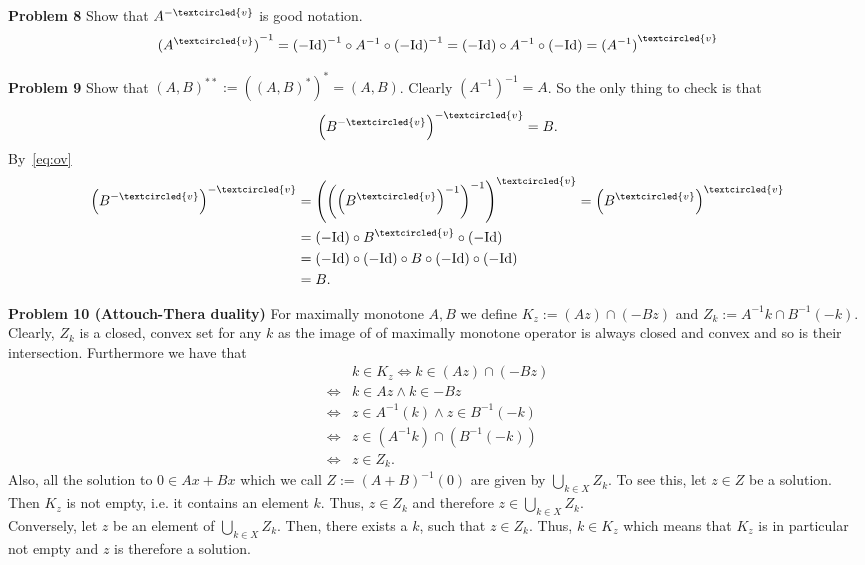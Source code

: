 \documentclass{scrartcl}
\theoremstyle{plain}
\theoremstyle{remark}
\newcommand{\Id}{\textup{Id}}
\newcommand{\ov}{\textcircled{v}}
\begin{document}
\textbf{Problem 8} Show that $A^{-\ov}$ is good notation.
\begin{equation}
  \label{eq:ov}
  {(A^{\ov})}^{-1} = {(-\Id)}^{-1} \circ A^{-1} \circ {(-\Id)}^{-1} = (-\Id) \circ A^{-1} \circ (-\Id) = {(A^{-1})}^{\ov}
\end{equation}

\textbf{Problem 9} Show that ${(A, B)}^{**} := {({(A, B)}^*)}^* = {(A, B)}$.
Clearly ${(A^{-1})}^{-1} = A$. So the only thing to check is that
\begin{equation}
  {\left(B^{-\ov}\right)}^{-\ov} = B.
\end{equation}
By~\eqref{eq:ov}
\begin{equation}
  \begin{aligned}
    {\left(B^{-\ov}\right)}^{-\ov} &= {\left({\left({\left(B^{\ov}\right)}^{-1}\right)}^{-1}\right)}^{\ov} = {\left(B^{\ov}\right)}^{\ov}\\
    &= {(-\Id)} \circ B^{\ov} \circ {(-\Id)} \\
    &= {(-\Id)} \circ {(-\Id)} \circ B \circ {(-\Id)} \circ {(-\Id)} \\
    &= B.
  \end{aligned}
\end{equation}

\textbf{Problem 10 (Attouch-Thera duality)} For maximally monotone $A,B$ we define $K_{z} := (Az) \cap (-Bz)$ and $Z_{k} := A^{-1}k \cap B^{-1}(-k)$. Clearly, $Z_{k}$ is a closed, convex set for any $k$ as the image of of maximally monotone operator is always closed and convex and so is their intersection.
Furthermore we have that
\begin{equation}
  \begin{aligned}
    & k \in K_{z} \Leftrightarrow k \in (Az) \cap (-Bz) \\
    \Leftrightarrow& k \in Az \wedge k \in -Bz \\
    \Leftrightarrow& z \in A^{-1}(k) \wedge z \in B^{-1}(-k) \\
    \Leftrightarrow& z \in (A^{-1}k) \cap (B^{-1}(-k)) \\
    \Leftrightarrow& z \in Z_{k}.
  \end{aligned}
\end{equation}
Also, all the solution to $0 \in Ax + Bx$ which we call $Z:= {(A + B)}^{-1}(0)$ are given by $\bigcup_{k \in X} Z_{k}$. To see this, let $z \in Z$ be a solution. Then $K_{z}$ is not empty, i.e. it contains an element $k$. 
Thus, $z \in Z_{k}$ and therefore $z \in \bigcup_{k \in X} Z_{k}$.\\
Conversely, let $z$ be an element of $\bigcup_{k \in X} Z_{k}$. Then, there exists a $k$, such that $z \in Z_{k}$. Thus, $k \in K_{z}$ which means that $K_{z}$ is in particular not empty and $z$ is therefore a solution.
\end{document}
